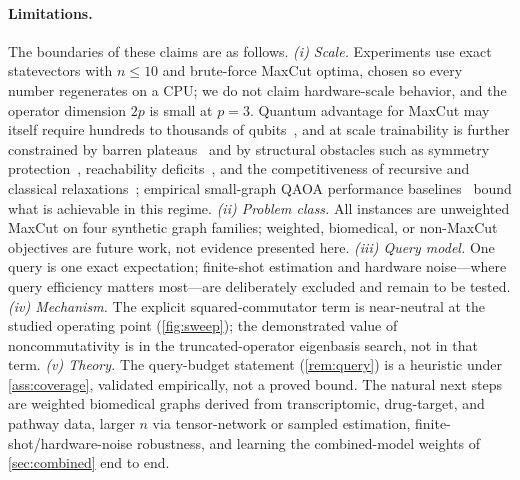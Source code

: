 \documentclass[aps,prxquantum,reprint,amsmath,amssymb,floatfix,nofootinbib,superscriptaddress,longbibliography]{revtex4-2}
\theoremstyle{remark}
\begin{document}
\paragraph{Limitations.}
The boundaries of these claims are as follows.
\emph{(i) Scale.}  Experiments use exact statevectors with \(n\le10\) and
brute-force MaxCut optima, chosen so every number regenerates on a CPU; we do not
claim hardware-scale behavior, and the operator dimension \(2p\) is small at
\(p{=}3\).  Quantum advantage for MaxCut may itself require hundreds to thousands
of qubits~\cite{guerreschi2019}, and at scale trainability is further constrained
by barren plateaus~\cite{mcclean2018barren} and by structural obstacles such as
symmetry protection~\cite{bravyi2020obstacles}, reachability
deficits~\cite{akshay2020reach}, and the competitiveness of recursive and
classical relaxations~\cite{bravyi2022coloring}; empirical small-graph QAOA
performance baselines~\cite{lotshaw2021} bound what is achievable in this regime.
\emph{(ii) Problem class.}  All instances are unweighted MaxCut on four synthetic
graph families; weighted, biomedical, or non-MaxCut objectives are future work,
not evidence presented here.
\emph{(iii) Query model.}  One query is one exact expectation; finite-shot
estimation and hardware noise---where query efficiency matters most---are
deliberately excluded and remain to be tested.
\emph{(iv) Mechanism.}  The explicit squared-commutator term is near-neutral at
the studied operating point (\cref{fig:sweep}); the demonstrated value of
noncommutativity is in the truncated-operator eigenbasis search, not in that
term.
\emph{(v) Theory.}  The query-budget statement (\cref{rem:query}) is a heuristic
under \cref{ass:coverage}, validated empirically, not a proved bound.
The natural next steps are weighted biomedical graphs derived from
transcriptomic, drug-target, and pathway data, larger \(n\) via tensor-network or
sampled estimation, finite-shot/hardware-noise robustness, and learning the
combined-model weights of \cref{sec:combined} end to end.
\end{document}
